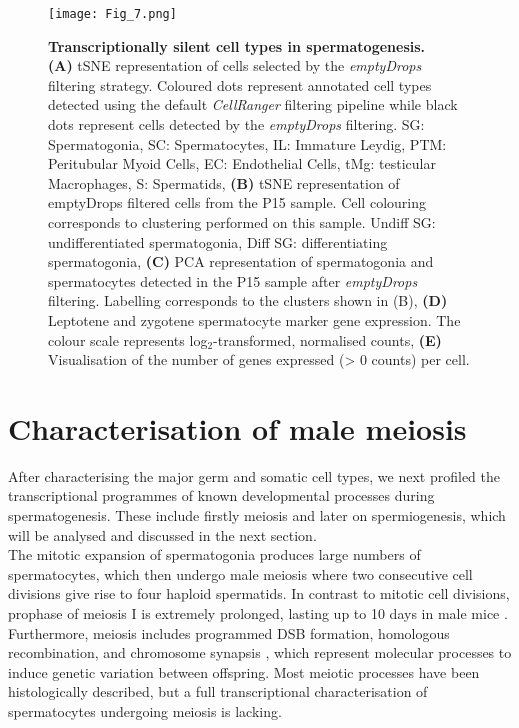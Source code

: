 \begin{figure}[!h]
\centering
\texttt{[image: Fig\_7.png]}
\caption[Transcriptionally silent cell types in spermatogenesis]{\textbf{Transcriptionally silent cell types in spermatogenesis.} \\
\textbf{(A)} tSNE representation of cells selected by the \emph{emptyDrops} filtering strategy. 
Coloured dots represent annotated cell types detected using the default \emph{CellRanger} filtering pipeline while black dots represent cells detected by the \emph{emptyDrops} filtering. 
SG: Spermatogonia, SC: Spermatocytes, IL: Immature Leydig, PTM: Peritubular Myoid Cells, EC: Endothelial Cells, tMg: testicular Macrophages, S: Spermatids, 
\textbf{(B)} tSNE representation of emptyDrops filtered cells from the P15 sample. Cell colouring corresponds to clustering performed on this sample. Undiff SG: undifferentiated spermatogonia, Diff SG: differentiating spermatogonia, 
\textbf{(C)} PCA representation of spermatogonia and spermatocytes detected in the P15 sample after \emph{emptyDrops} filtering. Labelling corresponds to the clusters shown in (B), 
\textbf{(D)} Leptotene and zygotene spermatocyte marker gene expression. The colour scale represents log$_2$-transformed, normalised counts, 
\textbf{(E)} Visualisation of the number of genes expressed (> 0 counts) per cell.}
\label{fig3:emptyDrops}
\end{figure}

\newpage

\section{Characterisation of male meiosis}

After characterising the major germ and somatic cell types, we next profiled the transcriptional programmes of known developmental processes during spermatogenesis. 
These include firstly meiosis and later on spermiogenesis, which will be analysed and discussed in the next section.\\

The mitotic expansion of spermatogonia produces large numbers of spermatocytes, which then undergo male meiosis where two consecutive cell divisions give rise to four haploid spermatids. 
In contrast to mitotic cell divisions, prophase of meiosis I is extremely prolonged, lasting up to 10 days in male mice \citep{Soh2017}. Furthermore, meiosis includes programmed DSB formation, homologous recombination, and chromosome synapsis \citep{Marston2004}, which represent molecular processes to induce genetic variation between offspring. 
Most meiotic processes have been histologically described, but a full transcriptional characterisation of spermatocytes undergoing meiosis is lacking. \\

